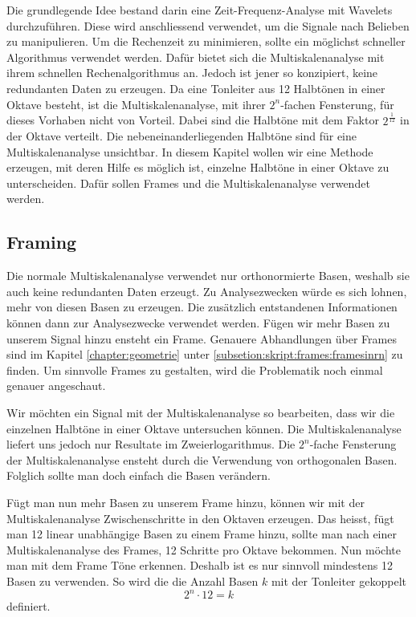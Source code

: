 



Die grundlegende Idee bestand darin eine Zeit-Frequenz-Analyse mit Wavelets durchzuführen. Diese wird anschliessend verwendet, um die Signale nach Belieben zu manipulieren. Um die Rechenzeit zu minimieren, sollte ein möglichst schneller Algorithmus verwendet werden. Dafür bietet sich die Multiskalenanalyse mit ihrem schnellen Rechenalgorithmus an. Jedoch ist jener so konzipiert, keine redundanten Daten zu erzeugen. Da eine Tonleiter aus 12 Halbtönen in einer Oktave besteht, ist die Multiskalenanalyse, mit ihrer $2^{n}$-fachen Fensterung, für dieses Vorhaben nicht von Vorteil. Dabei sind die Halbtöne mit dem Faktor $2^{\frac{1}{12}}$ in der Oktave verteilt. Die nebeneinanderliegenden Halbtöne sind für eine Multiskalenanalyse unsichtbar. 
In diesem Kapitel wollen wir eine Methode erzeugen, mit deren Hilfe es möglich ist, einzelne Halbtöne in einer Oktave zu unterscheiden. Dafür sollen Frames und die Multiskalenanalyse verwendet werden.




\subsection{Framing}

Die normale Multiskalenanalyse verwendet nur orthonormierte Basen, weshalb sie auch keine redundanten Daten erzeugt. Zu Analysezwecken würde es sich lohnen, mehr von diesen Basen zu erzeugen. Die zusätzlich entstandenen Informationen können dann zur Analysezwecke verwendet werden. Fügen wir mehr Basen zu unserem Signal hinzu ensteht ein Frame. Genauere Abhandlungen über Frames sind im Kapitel \ref{chapter:geometrie} unter \ref{subsetion:skript:frames:framesinrn} zu finden. Um sinnvolle Frames zu gestalten, wird die Problematik noch einmal genauer angeschaut.

Wir möchten ein Signal mit der Multiskalenanalyse so bearbeiten, dass wir die einzelnen Halbtöne in einer Oktave untersuchen können. Die Multiskalenanalyse liefert uns jedoch nur Resultate im Zweierlogarithmus. Die $2^{n}$-fache Fensterung der Multiskalenanalyse ensteht durch die Verwendung von orthogonalen Basen. Folglich sollte man doch einfach die Basen verändern.

Fügt man nun mehr Basen zu unserem Frame hinzu, können wir mit der Multiskalenanalyse Zwischenschritte in den Oktaven erzeugen. Das heisst, fügt man 12 linear unabhängige Basen zu einem Frame hinzu, sollte man nach einer Multiskalenanalyse des Frames, 12 Schritte pro Oktave bekommen. Nun möchte man mit dem Frame Töne erkennen. Deshalb ist es nur sinnvoll mindestens 12 Basen zu verwenden. So wird die die Anzahl Basen $k$ mit der Tonleiter gekoppelt
\[ 2^{n} \cdot 12 = k \]
definiert.

